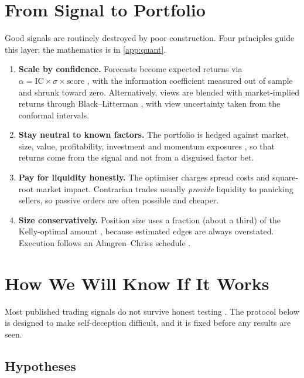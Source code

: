\documentclass[11pt,a4paper]{article}
\theoremstyle{plain}
\theoremstyle{definition}
\begin{document}
\section{From Signal to Portfolio}\label{sec:portfolio}

Good signals are routinely destroyed by poor construction. Four principles guide this layer; the mathematics is in \cref{app:quant}.

\begin{enumerate}
  \item \textbf{Scale by confidence.} Forecasts become expected returns via $\alpha = \mathrm{IC}\times\sigma\times\text{score}$ \citep{grinold2000}, with the information coefficient measured out of sample and shrunk toward zero. Alternatively, views are blended with market-implied returns through Black--Litterman \citep{black1992}, with view uncertainty taken from the conformal intervals.
  \item \textbf{Stay neutral to known factors.} The portfolio is hedged against market, size, value, profitability, investment and momentum exposures \citep{fama2015,carhart1997}, so that returns come from the signal and not from a disguised factor bet.
  \item \textbf{Pay for liquidity honestly.} The optimiser charges spread costs and square-root market impact. Contrarian trades usually \emph{provide} liquidity to panicking sellers, so passive orders are often possible and cheaper.
  \item \textbf{Size conservatively.} Position size uses a fraction (about a third) of the Kelly-optimal amount \citep{kelly1956}, because estimated edges are always overstated. Execution follows an Almgren--Chriss schedule \citep{almgren2001}.
\end{enumerate}

\section{How We Will Know If It Works}\label{sec:validation}

Most published trading signals do not survive honest testing \citep{harvey2016}. The protocol below is designed to make self-deception difficult, and it is fixed before any results are seen.

\subsection{Hypotheses}
\end{document}

